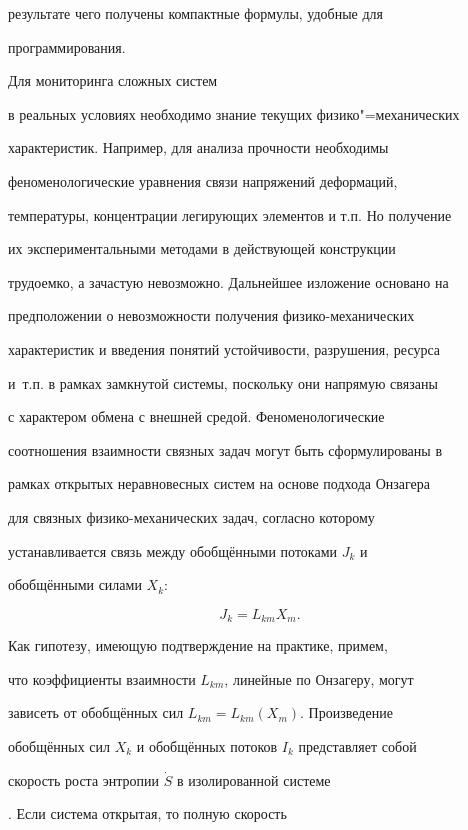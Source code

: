 результате чего получены компактные формулы, удобные для

программирования.



\smallskip



 Для мониторинга сложных систем

в реальных условиях необходимо знание текущих физико"=механических

характеристик. Например, для анализа прочности необходимы

феноменологические уравнения связи напряжений деформаций,

температуры, концентрации легирующих элементов и т.п. Но получение

их экспериментальными методами в действующей конструкции

трудоемко, а зачастую невозможно. Дальнейшее изложение основано на

предположении о невозможности получения физико-механических

характеристик и введения понятий устойчивости, разрушения, ресурса

и~т.п. в рамках замкнутой системы, поскольку они напрямую связаны

с характером обмена с внешней средой. Феноменологические

соотношения взаимности связных задач могут быть сформулированы в

рамках открытых неравновесных систем на основе подхода Онзагера

для связных физико-механических задач, согласно которому

устанавливается связь между обобщёнными потоками $J_{k}$ и

обобщёнными силами $X_k$:

$$

J_{k} =L_{km} X_{m}.

$$

\noindent Как гипотезу, имеющую подтверждение на практике, примем,

что коэффициенты взаимности $L_{km}$, линейные по Онзагеру, могут

зависеть от обобщённых сил $L_{km}=L_{km}(X_m)$. Произведение

обобщённых сил $X_k$ и обобщённых потоков $I_k$ представляет собой

скорость роста энтропии $\dot{S}$ в изолированной системе

\cite{fed:bib:Dea}. Если система открытая, то полную скорость

